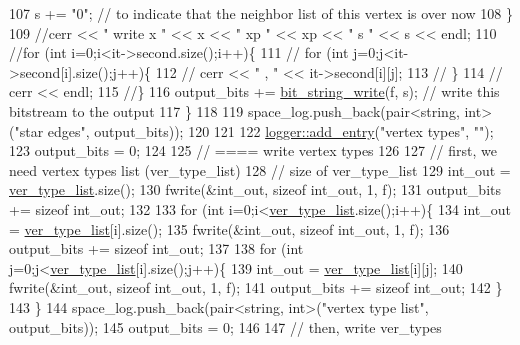 \begin{DoxyCode}
107       s += \textcolor{stringliteral}{"0"}; \textcolor{comment}{// to indicate that the neighbor list of this vertex is over now}
108     \}
109     \textcolor{comment}{//cerr << " write  x " << x << " xp " << xp << " s " << s << endl;}
110     \textcolor{comment}{//for (int i=0;i<it->second.size();i++)\{}
111     \textcolor{comment}{//  for (int j=0;j<it->second[i].size();j++)\{}
112     \textcolor{comment}{//    cerr << " , " << it->second[i][j];}
113     \textcolor{comment}{//  \}}
114     \textcolor{comment}{//  cerr << endl;}
115     \textcolor{comment}{//\}}
116     output\_bits += \hyperlink{compression__helper_8cpp_a9a2fbdf1fe0e38f631e7e242a819883b}{bit\_string\_write}(f, s); \textcolor{comment}{// write this bitstream to the output}
117   \}
118 
119   space\_log.push\_back(pair<string, int> (\textcolor{stringliteral}{"star edges"}, output\_bits));
120 
121 
122   \hyperlink{classlogger_a710163deb17bc81f70d53d285b8ac9ac}{logger::add\_entry}(\textcolor{stringliteral}{"vertex types"}, \textcolor{stringliteral}{""});
123   output\_bits = 0;
124 
125   \textcolor{comment}{// ==== write vertex types}
126 
127   \textcolor{comment}{// first, we need vertex types list (ver\_type\_list)}
128   \textcolor{comment}{// size of ver\_type\_list}
129   int\_out = \hyperlink{classmarked__graph__compressed_af2e3e55223d436628a02758dfae88493}{ver\_type\_list}.size();
130   fwrite(&int\_out, \textcolor{keyword}{sizeof} int\_out, 1, f);
131   output\_bits += \textcolor{keyword}{sizeof} int\_out;
132 
133   \textcolor{keywordflow}{for} (\textcolor{keywordtype}{int} i=0;i<\hyperlink{classmarked__graph__compressed_af2e3e55223d436628a02758dfae88493}{ver\_type\_list}.size();i++)\{
134     int\_out = \hyperlink{classmarked__graph__compressed_af2e3e55223d436628a02758dfae88493}{ver\_type\_list}[i].size();
135     fwrite(&int\_out, \textcolor{keyword}{sizeof} int\_out, 1, f);
136     output\_bits += \textcolor{keyword}{sizeof} int\_out;
137 
138     \textcolor{keywordflow}{for} (\textcolor{keywordtype}{int} j=0;j<\hyperlink{classmarked__graph__compressed_af2e3e55223d436628a02758dfae88493}{ver\_type\_list}[i].size();j++)\{
139       int\_out = \hyperlink{classmarked__graph__compressed_af2e3e55223d436628a02758dfae88493}{ver\_type\_list}[i][j];
140       fwrite(&int\_out, \textcolor{keyword}{sizeof} int\_out, 1, f);
141       output\_bits += \textcolor{keyword}{sizeof} int\_out;
142     \}
143   \}
144   space\_log.push\_back(pair<string, int>(\textcolor{stringliteral}{"vertex type list"}, output\_bits));
145   output\_bits = 0;
146   
147   \textcolor{comment}{// then, write ver\_types}

\end{DoxyCode}
